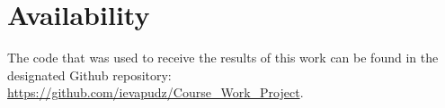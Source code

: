\documentclass[12pt]{article}
\begin{document}
	\section{Availability}

	The code that was used to receive the results of this work can be found
	in the designated Github repository: 
	\href{https://github.com/ievapudz/Course_Work_Project}{https://github.com/ievapudz/Course\_Work\_Project}.

	\newpage
	
	\nocite{*}
	
	\normalsize

 

\end{document}
